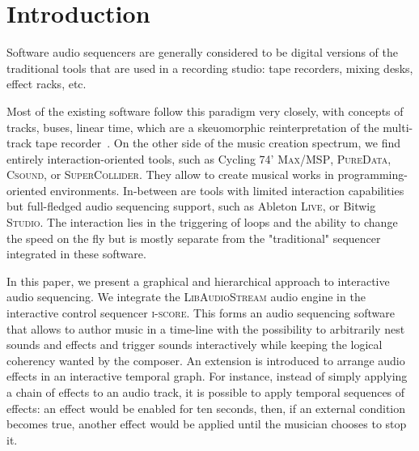 \documentclass{article}
\title{\papertitle}
\newcommand*{\LibAudioStream}{\textsc{LibAudioStream}\xspace}
\newcommand*{\iscore}{\textsc{i-score}\xspace}
\newcommand*{\maxmsp}{Cycling 74' \textsc{Max/MSP}\xspace}
\newcommand*{\puredata}{\textsc{PureData}\xspace}
\newcommand*{\csound}{\textsc{Csound}\xspace}
\newcommand*{\supercollider}{\textsc{SuperCollider}\xspace}
\newcommand*{\abletonlive}{Ableton \textsc{Live}\xspace}
\newcommand*{\bitwigstudio}{Bitwig \textsc{Studio}\xspace}
\begin{document}
\capstartfalse
\maketitle
\capstarttrue

\begin{abstract}
The field of digital music authoring provides a wealth of creative environments in which music can be created and authored: patchers, programming languages, and multitrack sequencers.
By combining the \iscore interactive sequencer to the \LibAudioStream audio engine, a new music software able to represent and play rich interactive audio sequences is introduced.
We present new stream expressions compatible with the \LibAudioStream, and 
use them to create an interactive audio graph: hierarchical stream and send - return streams.
This allows to create branching and arbitrarily nested musical scores, in an OSC-centric environment.
Three examples of interactive musical scores are presented: the recreation of a traditional multi-track sequencer, an interactive musical score, and a temporal effect graph.
\end{abstract}

\section{Introduction}
Software audio sequencers are generally considered to be digital versions 
of the traditional tools that are used in a recording studio: tape recorders, 
mixing desks, effect racks, etc.

Most of the existing software follow this paradigm very closely, with 
concepts of tracks, buses, linear time, which are a skeuomorphic reinterpretation of the multi-track tape recorder~\cite{bell2015skeuomorphism}.
On the other side of the music creation spectrum, we find entirely interaction-oriented tools, 
such as \maxmsp, \puredata, \csound, or \supercollider. 
They allow to create musical works in programming-oriented environments.
In-between are tools with limited interaction capabilities but full-fledged audio sequencing support, 
such as \abletonlive, or \bitwigstudio.
The interaction lies in the triggering of loops and the ability to change the speed on the fly but is mostly separate from the "traditional" sequencer integrated in these software.

In this paper, we present a graphical and hierarchical approach to interactive audio sequencing.
We integrate the \LibAudioStream audio engine in the interactive control sequencer \iscore.
This forms an audio sequencing software that allows to author music in a time-line 
with the possibility to arbitrarily nest sounds and effects and trigger sounds interactively 
while keeping the logical coherency wanted by the composer. 
An extension is introduced to arrange audio effects in an interactive temporal graph.
For instance, instead of simply applying a chain of effects to an audio track, it is possible to apply temporal sequences of effects: an effect would be enabled for ten seconds, then, if an external condition becomes true, another effect would be applied until the musician chooses to stop it.
\end{document}
